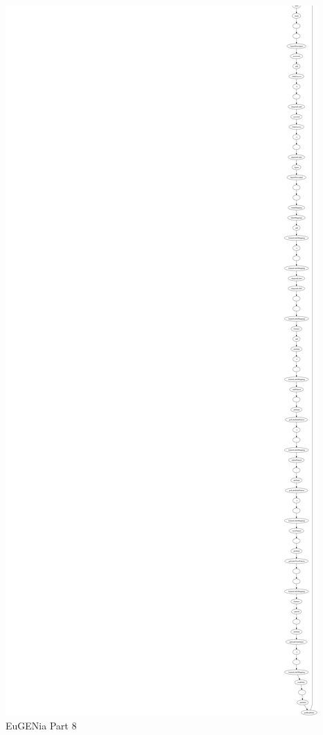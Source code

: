 \begin{minipage}[b]{\textwidth}
\centering
\includegraphics[height=0.97\textheight]{./figures/eug_9.png}
EuGENia Part 8
\end{minipage}